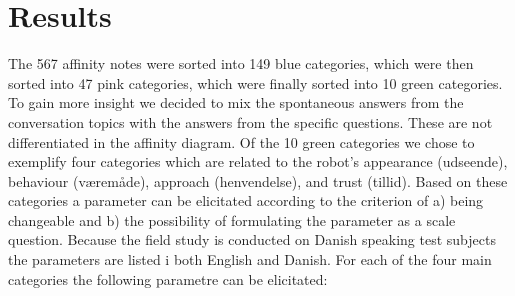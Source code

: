 \section{Results}
\label{Results}
%
The 567 affinity notes were sorted into 149 blue categories, which were then sorted into 47 pink categories, which were finally sorted into 10 green categories. To gain more insight we decided to mix the spontaneous answers from the conversation topics with the answers from the specific questions. These are not differentiated in the affinity diagram. Of the 10 green categories we chose to exemplify four categories which are related to the robot’s appearance (udseende), behaviour (væremåde), approach (henvendelse), and trust (tillid). Based on these categories a parameter can be elicitated according to the criterion of a) being changeable and b) the possibility of formulating the parameter as a scale question. Because the field study is conducted on Danish speaking test subjects the parameters are listed i both English and Danish. For each of the four main categories the following parametre can be elicitated:\\
%
